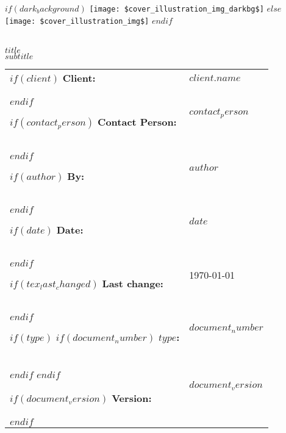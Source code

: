 \begin{titlepage}

\vspace*{-3cm}

\begin{center}
  $if(dark_background)$
    \texttt{[image: \$cover\_illustration\_img\_darkbg\$]}
  $else$
    \texttt{[image: \$cover\_illustration\_img\$]}
  $endif$
\end{center}

\begin{spacing}{2.0}

\noindent
\\
{\huge {\MakeUppercase{$title$}}}\\
{\Large {$subtitle$}}\\
\end{spacing}


\setlength\extrarowheight{3pt}
\begin{flushleft}
\noindent\begin{tabular}{@{}l l }

$if(client)$
{\bf Client:} & $client.name$ \\
$endif$

$if(contact_person)$
  {\bf Contact Person:} & $contact_person$ \\
$endif$

$if(author)$
{\bf By: } & $author$ \\
$endif$

$if(date)$
{\bf Date: } & $date$ \\
$endif$

$if(tex_last_changed)$
{\bf Last change:} & \today \\
$endif$

$if(type)$
  $if(document_number)$
  {\bf $type$:} & $document_number$ \\
  $endif$
$endif$

$if(document_version)$
{\bf Version:} & $document_version$ \\
$endif$

\end{tabular}
\end{flushleft}

\end{titlepage}

